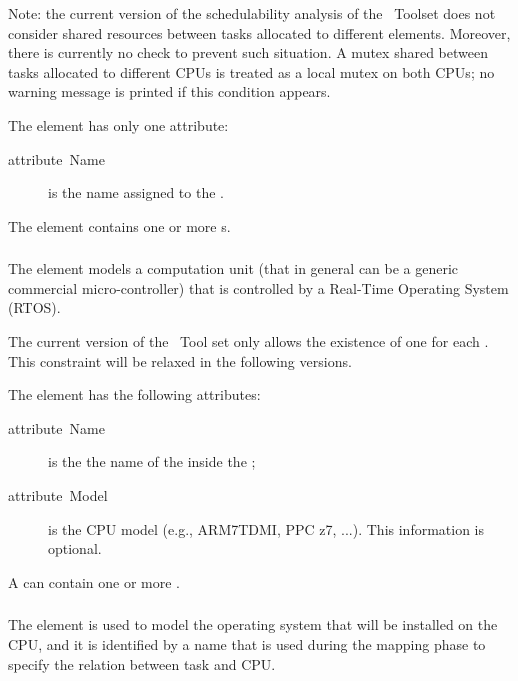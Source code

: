 Note: the current version of the schedulability analysis of the \rtd\
Toolset does not consider shared resources between tasks allocated
to different \const{CPU} elements. Moreover, there is currently no
check to prevent such situation. A mutex shared between tasks allocated
to different CPUs is treated as a local mutex on both CPUs; no warning
message is printed if this condition appears.

The  element has only one attribute:

\begin{description}
\item [{attribute~Name}] is the name assigned to the .
\end{description}

The  element contains one or more s.


\subsubsection{}

The  element models a computation unit (that in general can
be a generic commercial micro-controller) that is controlled by a
Real-Time Operating System (RTOS).

The current version of the \rtd\ Tool set only allows the existence of
one \const{RTOS} for each \const{CPU}. This constraint will be relaxed
in the following versions.

The  element has the following attributes:

\begin{description}
\item [{attribute~Name}] is the the name of the  inside the
  \const{ECU};
\item [{attribute~Model}] is the CPU model (e.g., ARM7TDMI, PPC z7,
  ...). This information is optional.
\end{description}

A  can contain one or more .


\subsubsection{}

The  element is used to model the operating system that
will be installed on the CPU, and it is identified by a name that is
used during the mapping phase to specify the relation between task and
CPU.

